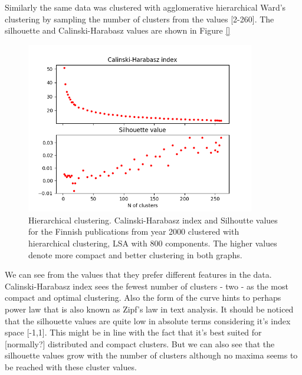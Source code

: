 Similarly the same data was clustered with agglomerative 
hierarchical Ward's clustering by sampling the number of clusters 
from the values [2-260]. The silhouette and Calinski-Harabasz values
are shown in Figure \ref{}
\begin{figure}[ht]
  \begin{center}    
\includegraphics[width=10cm]{images/c-h-silh-index-plot-y2000-2_260-800-hierarchical.png}
    \caption{Hierarchical clustering. Calinski-Harabasz index and Silhoutte values for the
    Finnish publications from year 2000 clustered with hierarchical
    clustering, LSA with 800 components. The higher values denote 
    more compact and better clustering in both graphs.}
    \label{fig:ch-silh-2000-01}
  \end{center}
\end{figure}
We can see from the values that they prefer different features in
the data. Calinski-Harabasz index sees the fewest number of 
clusters - two - as the most compact and optimal clustering. Also
the form of the curve hints to perhaps power law that is also 
known as Zipf's law in text analysis. 
It should be noticed that the silhouette values are quite low 
in absolute terms considering it's index space [-1,1]. This might 
be in line with the fact that it's best suited for [normally?] 
distributed and compact clusters. But we can also see that the 
silhouette values grow with the number of clusters although no
maxima seems to be reached with these cluster values.










